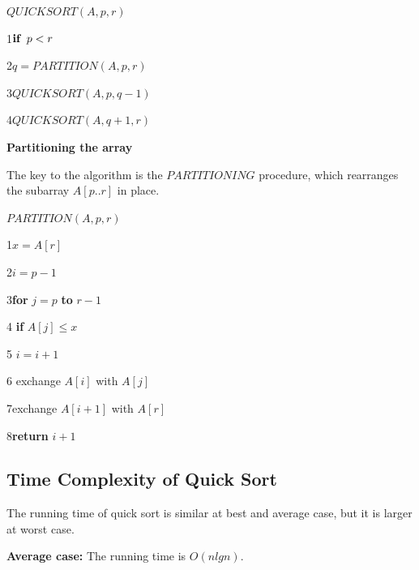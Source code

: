 \documentclass[12 pt,a4paper]{report}
\begin{document}
$QUICKSORT(A,p,r)$

1\hspace{0.5cm}$\textbf{if}\hspace{0.2cm}p<r$

2\hspace{1cm}$q=PARTITION(A,p,r)$

3\hspace{1cm}$QUICKSORT(A,p,q-1)$

4\hspace{1cm}$QUICKSORT(A,q+1,r)$

\vspace{0.5cm}

\textbf{Partitioning the array}

\vspace{0.5cm}

The key to the algorithm is the $PARTITIONING$ procedure, which rearranges the subarray $A[p..r]$ in place.

\vspace{0.5cm}

$PARTITION(A,p,r)$

1\hspace{0.5cm}$x=A[r]$

2\hspace{0.5cm}$i=p-1$

3\hspace{0.5cm}\textbf{for} $j=p$  \textbf{to} $r-1$

4\hspace{1cm} \textbf{if} $A[j] \leq x$

5\hspace{1.5cm} $i=i+1$

6\hspace{1.5cm} exchange $A[i]$ with $A[j]$

7\hspace{0.5cm}exchange $A[i+1]$ with $A[r]$

8\hspace{0.5cm}\textbf{return} $i+1$

\subsection{Time Complexity of Quick Sort}

The running time of quick sort is similar at best and average case, but it is larger at worst case.

\vspace{0.5cm}

\textbf{Average case:} The running time is $O(nlgn)$.
\end{document}
